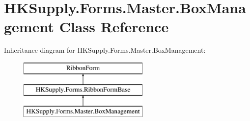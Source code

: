 \hypertarget{class_h_k_supply_1_1_forms_1_1_master_1_1_box_management}{}\section{H\+K\+Supply.\+Forms.\+Master.\+Box\+Management Class Reference}
\label{class_h_k_supply_1_1_forms_1_1_master_1_1_box_management}
Inheritance diagram for H\+K\+Supply.\+Forms.\+Master.\+Box\+Management\+:\begin{figure}[H]
\begin{center}
\leavevmode
\includegraphics[height=3.000000cm]{class_h_k_supply_1_1_forms_1_1_master_1_1_box_management}
\end{center}
\end{figure}
